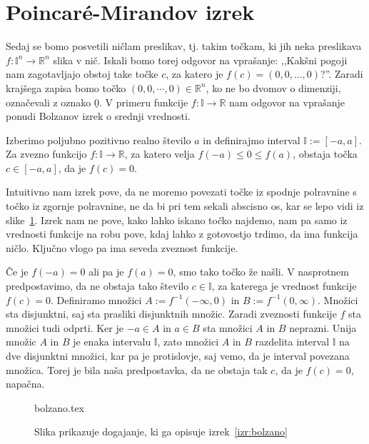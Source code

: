 \documentclass[mat1]{fmfdelo}
\newcommand{\R}{\mathbb R}
\newcommand{\I}{\mathbb I}
\newcommand{\0}{\underline{0}}
\def\citat#1{,,#1''}
\begin{document}
\section{Poincar\'e-Mirandov izrek}\label{raz:PM}
Sedaj se bomo posvetili ničlam preslikav, tj. takim točkam, ki jih neka preslikava $f : \I^n \to \R^n$ slika v nič. Iskali bomo torej odgovor na vprašanje: \citat{Kakšni pogoji nam zagotavljajo obstoj take točke $c$, za katero je $f(c) = (0, 0, \dots, 0)$?}. Zaradi krajšega zapisa bomo točko $(0, 0, \cdots, 0) \in \R^n$, ko ne bo dvomov o dimenziji, označevali z oznako $\0$. V primeru funkcije $f : \I \to \R$ nam odgovor na vprašanje ponudi Bolzanov izrek o srednji vrednosti.
\begin{izrek}\label{izr:bolzano}
Izberimo poljubno pozitivno realno število $a$ in definirajmo interval $\I := [-a, a]$. Za zvezno funkcijo $f : \I \to \R$, za katero velja $f(-a) \leq 0 \leq f(a)$, obstaja točka $c \in [-a, a]$, da je $f(c) = 0$.
\end{izrek}
Intuitivno nam izrek pove, da ne moremo povezati točke iz spodnje polravnine s točko iz zgornje polravnine, ne da bi pri tem sekali abscisno os, kar se lepo vidi iz slike~\ref{fig:bolzano}. Izrek nam ne pove, kako lahko iskano točko najdemo, nam pa samo iz vrednosti funkcije na robu pove, kdaj lahko z gotovostjo trdimo, da ima funkcija ničlo. Ključno vlogo pa ima seveda zveznost funkcije.
\begin{dokaz}
Če je $f(-a) = 0$ ali pa je $f(a) = 0$, smo tako točko že našli. V nasprotnem predpostavimo, da ne obstaja tako število $c \in \I$, za katerega je vrednost funkcije $f(c) = 0$. Definiramo množici $A := f^{-1}(- \infty, 0)$ in $B := f^{-1}(0, \infty)$. Množici sta disjunktni, saj sta prasliki disjunktnih množic. Zaradi zveznosti funkcije $f$ sta množici tudi odprti. Ker je $-a \in A$ in $a \in B$ sta množici $A$ in $B$ neprazni. Unija množic $A$ in $B$ je enaka intervalu $\I$, zato množici $A$ in $B$ razdelita interval $\I$ na dve disjunktni množici, kar pa je protislovje, saj vemo, da je interval povezana množica. Torej je bila naša predpostavka, da ne obstaja tak $c$, da je $f(c) = 0$, napačna.
\end{dokaz}
\begin{figure}[h!]
	\centering
	{bolzano.tex}
	\caption{Slika prikazuje dogajanje, ki ga opisuje izrek~\ref{izr:bolzano}}\label{fig:bolzano}
\end{figure}
\end{document}
